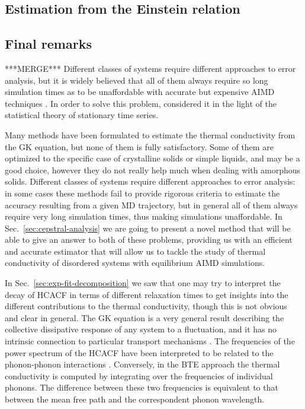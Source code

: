 \begin{LEtext}
\subsection{Estimation from the Einstein relation}
\LEnote{***************}


\subsection{Final remarks}  \label{sec:data-analysis-remarks}
***MERGE*** Different classes of systems require different approaches to error analysis, but it is widely believed that all of them always require so long simulation times as to be unaffordable with accurate but expensive AIMD techniques \citep{Carbogno:2017gc}. In order to solve this problem, \cite{Ercole2017} considered it in the light of the statistical theory of stationary time series.

Many methods have been formulated to estimate the thermal conductivity from the GK equation, but none of them is fully satisfactory. Some of them are optimized to the specific case of crystalline solids or simple liquids, and may be a good choice, however they do not really help much when dealing with amorphous solids. 
Different classes of systems require different approaches to error analysis: in some cases these methods fail to provide rigorous criteria to estimate the accuracy resulting from a given MD trajectory, but in general all of them always require very long simulation times, thus making \abinitio simulations unaffordable. 
In Sec.~\ref{sec:cepstral-analysis} we are going to present a novel method that will be able to give an answer to both of these problems, providing us with an efficient and accurate estimator that will allow us to tackle the study of thermal conductivity of disordered systems with equilibrium AIMD simulations. 

In Sec.~\ref{sec:exp-fit-decomposition} we saw that one may try to interpret the decay of HCACF in terms of different relaxation times to get insights into the different contributions to the thermal conductivity, though this is not obvious and clear in general. 
The GK equation is a very general result describing the collective dissipative response of any system to a fluctuation, and it has no intrinsic connection to particular transport mechanisms \cite{Howell2012}. 
The frequencies of the power spectrum of the HCACF have been interpreted to be related to the phonon-phonon interactions \cite{McGaughey2004a}. Conversely, in the BTE approach the thermal conductivity is computed by integrating over the frequencies of individual phonons. The difference between these two frequencies is equivalent to that between the mean free path and the correspondent phonon wavelength. 


\end{LEtext}
